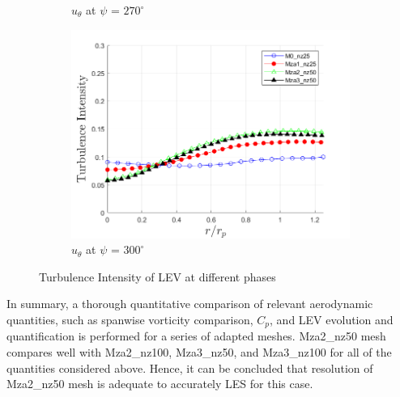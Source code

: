 \begin{figure}[H]
\begin{subfigure}[b]{0.475\textwidth}
		\caption{$u_\theta$ at $\psi$ = $270^\circ$}
		\label{fig:zonal_TI_270}
	\end{subfigure}
	\begin{subfigure}[b]{0.475\textwidth}
		\centering
		\includegraphics[width=1\textwidth]{figures/zonal_adapt_results/LEV/u_theta/TI_phase_300.png}
		\caption{$u_\theta$ at $\psi$ = $300^\circ$}
		\label{fig:zonal_TI_300}
	\end{subfigure}
	\caption{ Turbulence Intensity of LEV at different phases}
	\label{fig:zonal_TI_plots_LEV}
\end{figure}

In summary, a thorough quantitative comparison of relevant aerodynamic quantities, such as spanwise vorticity comparison, $C_p$, and LEV evolution and quantification is performed for a series of adapted meshes. Mza2\_nz50 mesh compares well with Mza2\_nz100, Mza3\_nz50, and Mza3\_nz100 for all of the quantities considered above.
Hence, it can be concluded that resolution of Mza2\_nz50 mesh is adequate to accurately LES for this case.